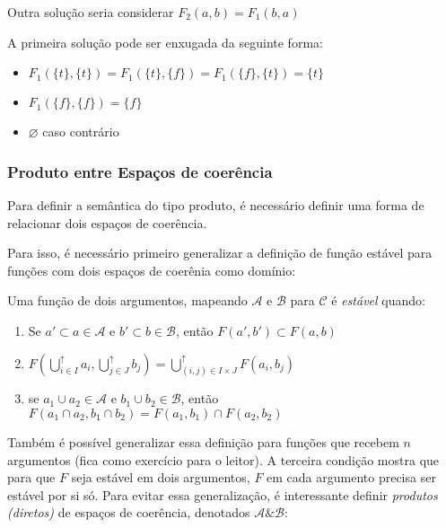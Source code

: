 \documentclass[../main.tex]{subfiles}
\begin{document}
Outra solução seria considerar $F_2(a, b) = F_1(b, a)$

A primeira solução pode ser enxugada da seguinte forma:

\begin{itemize}
    \item $F_1(\{t\}, \{t\}) = F_1(\{t\}, \{f\})  = F_1(\{f\}, \{t\})  = \{t\}$ 
    \item $F_1(\{f\}, \{f\}) = \{ f \}$ 
    \item $\varnothing$ caso contrário
\end{itemize}

\subsubsection{Produto entre Espaços de coerência}

Para definir a semântica do tipo produto, é necessário definir uma forma de relacionar dois espaços de coerência.

Para isso, é necessário primeiro generalizar a definição de função estável para funções com dois espaços de coerênia como domínio:

\begin{definition}
    Uma função de dois argumentos, mapeando $\mathcal{A}$ e $\mathcal{B}$ para $\mathcal{C}$ é \emph{estável} quando:
    \begin{enumerate}
        \item Se $a' \subset a \in \mathcal{A}$ e $b' \subset b \in \mathcal{B}$, então $F(a', b') \subset F(a, b)$
        \item $F(\bigcup_{i \in I}^{\uparrow} a_i, \bigcup_{j \in J}^{\uparrow} b_j) = \bigcup_{(i, j) \in I \times J}^{\uparrow} F(a_i, b_j)$
        \item se $a_1 \cup a_2 \in \mathcal{A}$ e $b_1 \cup b_2 \in \mathcal{B}$, então $F(a_1 \cap a_2, b_1 \cap b_2) = F(a_1, b_1) \cap F(a_2, b_2)$
    \end{enumerate}
\end{definition}

Também é possível generalizar essa definição para funções que recebem $n$ argumentos (fica como exercício para o leitor). A terceira condição mostra que para que $F$ seja estável em dois argumentos, $F$ em cada argumento precisa ser estável por si só. Para evitar essa generalização, é interessante definir \emph{produtos (diretos)} de espaços de coerência, denotados $\mathcal{A} \& \mathcal{B}$:
\end{document}
